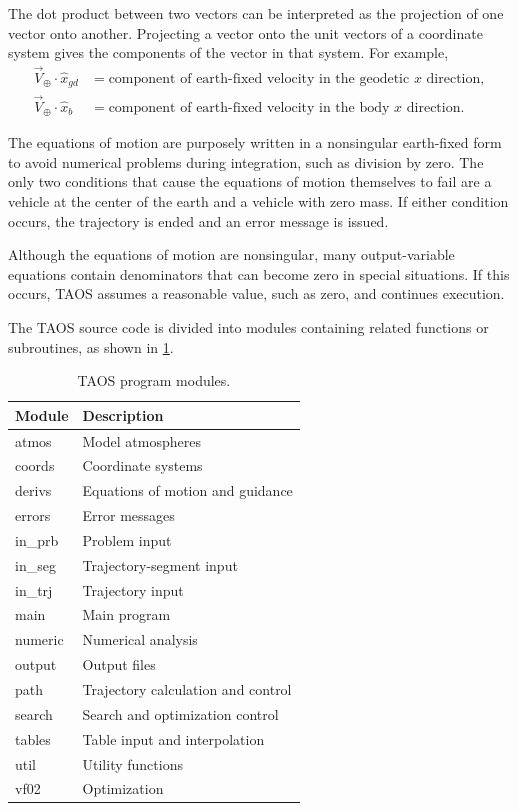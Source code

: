 The dot product between two vectors can be interpreted as the projection of one
vector onto another. Projecting a vector onto the unit vectors of a coordinate system
gives the components of the vector in that system. For example,
\[
\begin{aligned}
  \vec{V}_{\oplus}\mathbin{\cdot}\hat{x}_{gd}
    &={} \text{component of earth-fixed velocity in the geodetic $x$ direction},\\
  \vec{V}_{\oplus}\mathbin{\cdot}\hat{x}_{b}
    &={} \text{component of earth-fixed velocity in the body $x$ direction}.
\end{aligned}
\]


The equations of motion are purposely written in a nonsingular earth-fixed form to
avoid numerical problems during integration, such as division by zero. The only two
conditions that cause the equations of motion themselves to fail are a vehicle at the
center of the earth and a vehicle with zero mass. If either condition occurs, the
trajectory is ended and an error message is issued.

Although the equations of motion are nonsingular, many output-variable equations
contain denominators that can become zero in special situations. If this occurs,
TAOS assumes a reasonable value, such as zero, and continues execution.


The TAOS source code is divided into modules containing related functions or
subroutines, as shown in \cref{tab:taos-program-modules}.

\begin{table}[htbp]
  \centering
  \caption{TAOS program modules.}
  \label{tab:taos-program-modules}
  \begin{tabularx}{0.68\linewidth}{@{}>{\ttfamily}lX@{}}
    \toprule
    \normalfont Module & Description \\
    \midrule
    atmos  & Model atmospheres \\
    coords & Coordinate systems \\
    derivs & Equations of motion and guidance \\
    errors & Error messages \\
    in\_prb & Problem input \\
    in\_seg & Trajectory-segment input \\
    in\_trj & Trajectory input \\
    main   & Main program \\
    numeric & Numerical analysis \\
    output & Output files \\
    path   & Trajectory calculation and control \\
    search & Search and optimization control \\
    tables & Table input and interpolation \\
    util   & Utility functions \\
    vf02   & Optimization \\
    \bottomrule
  \end{tabularx}
\end{table}

